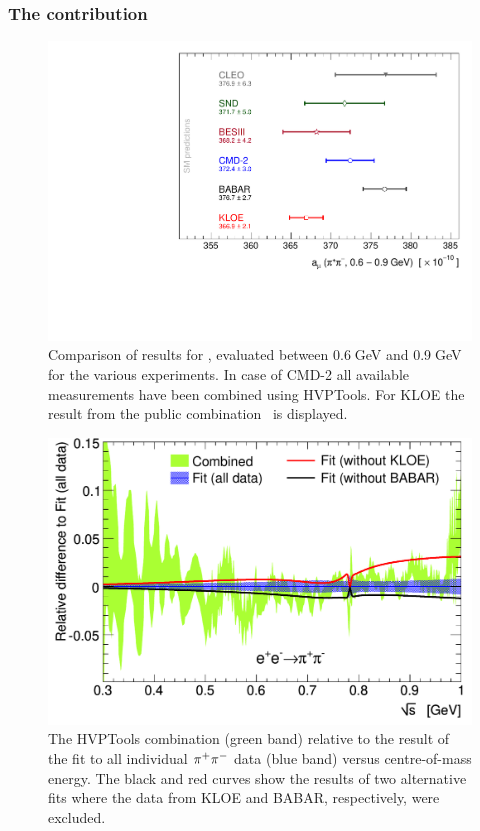 \subsubsection*{The \sansmath\pip\pim contribution}

\begin{figure}[t]
\vspace{0.4cm}
\begin{center}
\includegraphics[width=\figsize]{Figures/amu2pi.pdf}
\end{center}
  \vspace{-0.15cm}
  \caption{Comparison of results for \amuhadLOpp, evaluated between 0.6$\;$GeV and 0.9$\;$GeV for the various experiments. In case of CMD-2 all available measurements have been combined using HVPTools. For KLOE the result from the public combination~\cite{kloe17} is displayed.}
  \label{fig:amu2pi}
\end{figure}
\begin{figure}[t]
\vspace{0.4cm}
\begin{center}
\includegraphics[width=\figsize]{Figures/ff2_comp_dhmz19.pdf}
\end{center}
  \vspace{-0.3cm}
  \caption{The HVPTools combination (green band) relative to the result of the fit to all individual $\pi^+\pi^-$ data (blue band)  versus centre-of-mass energy. The black and red curves show the results of two alternative fits where the data from KLOE and BABAR, respectively,   were excluded.}
  \label{fig:ff2_comp}
\end{figure}
